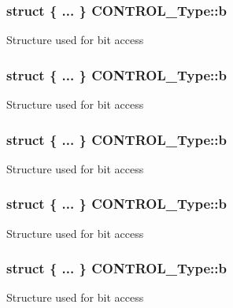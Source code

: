\subsubsection[{\texorpdfstring{b}{b}}]{\setlength{\rightskip}{0pt plus 5cm}struct \{ ... \}   C\+O\+N\+T\+R\+O\+L\+\_\+\+Type\+::b}\hypertarget{unionCONTROL__Type_ae3b4861e899b1f68818b60033a3914d9}{}\label{unionCONTROL__Type_ae3b4861e899b1f68818b60033a3914d9}
Structure used for bit access 
\subsubsection[{\texorpdfstring{b}{b}}]{\setlength{\rightskip}{0pt plus 5cm}struct \{ ... \}   C\+O\+N\+T\+R\+O\+L\+\_\+\+Type\+::b}\hypertarget{unionCONTROL__Type_acacca329e6d291cb2b725f59923cdf27}{}\label{unionCONTROL__Type_acacca329e6d291cb2b725f59923cdf27}
Structure used for bit access 
\subsubsection[{\texorpdfstring{b}{b}}]{\setlength{\rightskip}{0pt plus 5cm}struct \{ ... \}   C\+O\+N\+T\+R\+O\+L\+\_\+\+Type\+::b}\hypertarget{unionCONTROL__Type_afa110d4f7b263a9b5c34fb737ccb7fed}{}\label{unionCONTROL__Type_afa110d4f7b263a9b5c34fb737ccb7fed}
Structure used for bit access 
\subsubsection[{\texorpdfstring{b}{b}}]{\setlength{\rightskip}{0pt plus 5cm}struct \{ ... \}   C\+O\+N\+T\+R\+O\+L\+\_\+\+Type\+::b}\hypertarget{unionCONTROL__Type_a7579e944a74b155b0e5f1c17ac0309d7}{}\label{unionCONTROL__Type_a7579e944a74b155b0e5f1c17ac0309d7}
Structure used for bit access 
\subsubsection[{\texorpdfstring{b}{b}}]{\setlength{\rightskip}{0pt plus 5cm}struct \{ ... \}   C\+O\+N\+T\+R\+O\+L\+\_\+\+Type\+::b}\hypertarget{unionCONTROL__Type_a88c1d6237b6d97c2dc152a22c765dd54}{}\label{unionCONTROL__Type_a88c1d6237b6d97c2dc152a22c765dd54}
Structure used for bit access 
